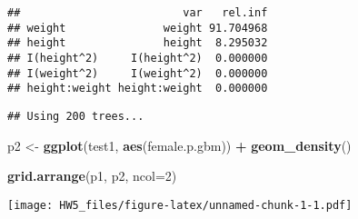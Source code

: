 \documentclass[]{article}
\newenvironment{Shaded}{\begin{snugshade}}{\end{snugshade}}
\newcommand{\DataTypeTok}[1]{\textcolor[rgb]{0.13,0.29,0.53}{#1}}
\newcommand{\DecValTok}[1]{\textcolor[rgb]{0.00,0.00,0.81}{#1}}
\newcommand{\FloatTok}[1]{\textcolor[rgb]{0.00,0.00,0.81}{#1}}
\newcommand{\KeywordTok}[1]{\textcolor[rgb]{0.13,0.29,0.53}{\textbf{#1}}}
\newcommand{\NormalTok}[1]{#1}
\newcommand{\OperatorTok}[1]{\textcolor[rgb]{0.81,0.36,0.00}{\textbf{#1}}}
\newcommand{\OtherTok}[1]{\textcolor[rgb]{0.56,0.35,0.01}{#1}}
\newcommand{\StringTok}[1]{\textcolor[rgb]{0.31,0.60,0.02}{#1}}
\begin{document}
\begin{verbatim}
##                         var   rel.inf
## weight               weight 91.704968
## height               height  8.295032
## I(height^2)     I(height^2)  0.000000
## I(weight^2)     I(weight^2)  0.000000
## height:weight height:weight  0.000000
\end{verbatim}

\begin{Shaded}
\end{Shaded}

\begin{verbatim}
## Using 200 trees...
\end{verbatim}

\begin{Shaded}
\begin{Highlighting}[]
\NormalTok{p2 <-}\StringTok{ }\KeywordTok{ggplot}\NormalTok{(test1, }\KeywordTok{aes}\NormalTok{(female.p.gbm)) }\OperatorTok{+}\StringTok{ }\KeywordTok{geom_density}\NormalTok{()}

\KeywordTok{grid.arrange}\NormalTok{(p1, p2, }\DataTypeTok{ncol=}\DecValTok{2}\NormalTok{)}
\end{Highlighting}
\end{Shaded}

\texttt{[image: HW5\_files/figure-latex/unnamed-chunk-1-1.pdf]}

\begin{Shaded}
\end{Shaded}
\end{document}
